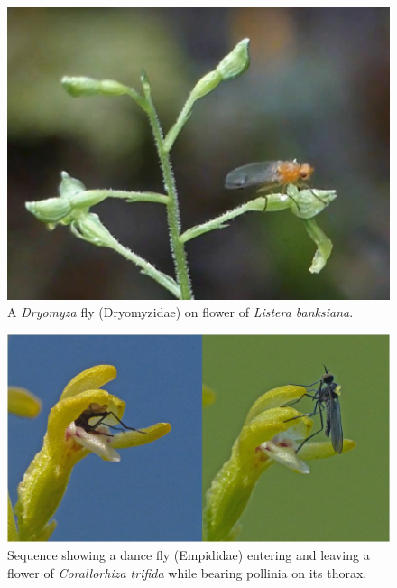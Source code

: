\begin{multicols}{2}
\begin{figure}[H]
\begin{center}
\vspace{2mm}
\includegraphics[width=\textwidth]{img/Listera_banksiana_Dryomyza.jpg}
\caption{A \emph{Dryomyza} fly (Dryomyzidae) on flower of \emph{Listera banksiana}.}
\label{Listera_banksiana_Dryomyza}
\end{center}
\end{figure}

\begin{figure}[H]
\begin{center}
\vspace{2mm}
\includegraphics[width=\textwidth]{img/Corallorhiza_trifida_Empididae.jpg}
\caption{Sequence showing a dance fly (Empididae) entering and leaving a flower of \emph{Corallorhiza trifida} while bearing pollinia on its thorax.}
\label{Corallorhiza_trifida_Empididae}
\end{center}
\end{figure}


\end{multicols}
